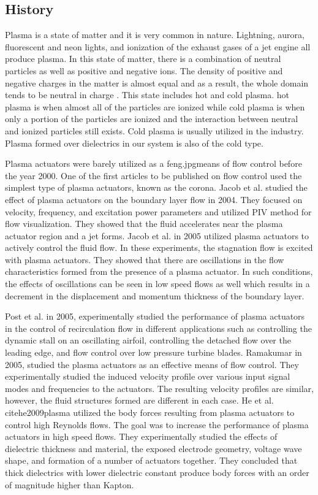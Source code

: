 \documentclass[fleqn,10pt]{SelfArx} %
\begin{document}
\subsection{History}
Plasma is a state of matter and it is very common in nature. Lightning, aurora, fluorescent and neon lights, and ionization of the exhaust gases of a jet engine all produce plasma. In this state of matter, there is a combination of neutral particles as well as positive and negative ions. The density of positive and negative charges in the matter is almost equal and as a result, the whole domain tends to be neutral in charge \cite{shuryak1978theory}. This state includes hot and cold plasma. hot plasma is when almost all of the particles are ionized while cold plasma is when only a portion of the particles are ionized and the interaction between neutral and ionized particles still exists. Cold plasma is usually utilized in the industry. Plasma formed over dielectrics in our system is also of the cold type.

Plasma actuators were barely utilized as a feng.jpgmeans of flow control before the year 2000. One of the first articles to be published on flow control used the simplest type of plasma actuators, known as the corona. Jacob et al. \cite{jacob2004boundary} studied the effect of plasma actuators on the boundary layer flow in 2004. They focused on velocity, frequency, and excitation power parameters and utilized PIV method for flow visualization. They showed that the fluid accelerates near the plasma actuator region and a jet forms. Jacob et al. in 2005 \cite{jacob2005control} utilized plasma actuators to actively control the fluid flow. In these experiments, the stagnation flow is excited with plasma actuators. They showed that there are oscillations in the flow characteristics formed from the presence of a plasma actuator. In such conditions, the effects of oscillations can be seen in low speed flows as well which results in a decrement in the displacement and momentum thickness of the boundary layer.

Post et al. \cite{post2005flow} in 2005, experimentally studied the performance of plasma actuators in the control of recirculation flow in different applications such as controlling the dynamic stall on an oscillating airfoil, controlling the detached flow over the leading edge, and flow control over low pressure turbine blades. Ramakumar \cite{ramakumar2005flow} in 2005, studied the plasma actuators as an effective means of flow control. They experimentally studied the induced velocity profile over various input signal modes and frequencies to the actuators. The resulting velocity profiles are similar, however, the fluid structures formed are different in each case. He et al. cite{he2009plasma} utilized the body forces resulting from plasma actuators to control high Reynolds flows. The goal was to increase the performance of plasma actuators in high speed flows. They experimentally studied the effects of dielectric thickness and material, the exposed electrode geometry, voltage wave shape, and formation of a number of actuators together. They concluded that thick dielectrics with lower dielectric constant produce body forces with an order of magnitude higher than Kapton.
\end{document}
